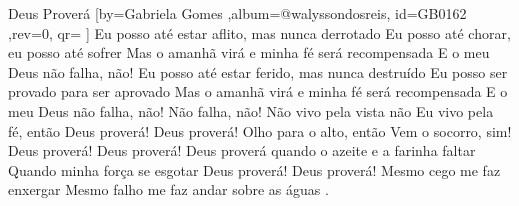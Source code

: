 \beginsong
{Deus Proverá %
}[by={Gabriela Gomes  %
},album={@walyssondosreis},
id={GB0162 %
},rev={0}, %
qr={ %
}]
\beginverse
Eu posso até estar aflito, mas nunca derrotado
Eu posso até chorar, eu posso até sofrer
Mas o amanhã virá e minha fé será recompensada
E o meu Deus não falha, não!
\endverse
\beginverse
Eu posso até estar ferido, mas nunca destruído
Eu posso ser provado para ser aprovado
Mas o amanhã virá e minha fé será recompensada
E o meu Deus não falha, não!
Não falha, não!
\endverse
\beginverse
Não vivo pela vista não
Eu vivo pela fé, então
Deus proverá! Deus proverá!
Olho para o alto, então
Vem o socorro, sim!
Deus proverá! Deus proverá!
\endverse
\beginchorus
Deus proverá quando o azeite e a farinha faltar
Quando minha força se esgotar
Deus proverá! Deus proverá!
Mesmo cego me faz enxergar
Mesmo falho me faz andar sobre as águas
\endchorus
\beginverse*
.
\endverse
\begin{comment}
\lstset{basicstyle=\scriptsize\bf} %
\tab{Solo 1}
\begin{lstlisting}
E|-----------------------------------------------------|
B|-----------------------------------------------------|
G|-----------------------------------------------------|
D|-----------------------------------------------------|
A|-----------------------------------------------------|
E|-----------------------------------------------------|
\end{lstlisting}
\end{comment}
\vspace{2em} 
% 
% 
